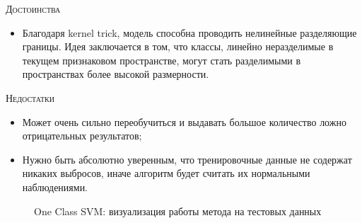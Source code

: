 \documentclass[12pt]{article}
\begin{document}
    \noindent \textsc{Достоинства}
    \begin{itemize}
        \item Благодаря kernel trick, модель способна проводить нелинейные разделяющие границы. Идея заключается в том, что классы, линейно неразделимые в текущем признаковом пространстве, могут стать разделимыми в пространствах более высокой размерности.
    \end{itemize}
    
    \noindent \textsc{Недостатки}
    \begin{itemize}
        \item Может очень сильно переобучиться и выдавать большое количество ложно отрицательных результатов;
        \item Нужно быть абсолютно уверенным, что тренировочные данные не содержат никаких выбросов, иначе алгоритм будет считать их нормальными наблюдениями.
    \end{itemize}

    \begin{figure}[h!]
        \centering
        \caption{One Class SVM: визуализация работы метода на тестовых данных}
        \label{sec:Research:Model:Visualization:fig:OneClassSVM}
    \end{figure}
\end{document}
